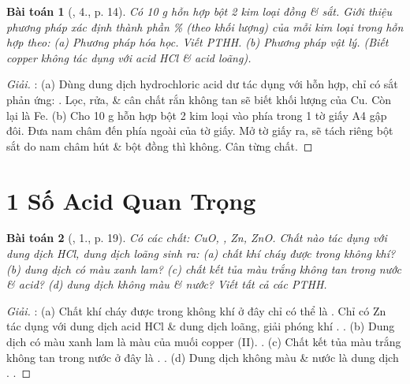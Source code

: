 \documentclass{article}
\newtheorem{baitoan}{Bài toán}
\begin{document}
\begin{baitoan}[\cite{SGK_Hoa_Hoc_9}, 4., p. 14]
	Có {\rm10 g} hỗn hợp bột 2 kim loại đồng \& sắt. Giới thiệu phương pháp xác định thành phần \% (theo khối lượng) của mỗi kim loại trong hỗn hợp theo: (a) Phương pháp hóa học. Viết PTHH. (b) Phương pháp vật lý. (Biết copper không tác dụng với acid {\rm HCl} \& acid {\rm{}} loãng).
\end{baitoan}

\begin{proof}[Giải]
	\cite[p. 12]{Ninh_giai_BT_Hoa_Hoc_9}: (a) Dùng dung dịch hydrochloric acid dư tác dụng với hỗn hợp, chỉ có sắt phản ứng: . Lọc, rửa, \& cân chất rắn không tan sẽ biết khối lượng của Cu. Còn lại là Fe. (b) Cho 10 g hỗn hợp bột 2 kim loại vào phía trong 1 tờ giấy A4 gập đôi. Đưa nam châm đến phía ngoài của tờ giấy. Mở tờ giấy ra, sẽ tách riêng bột sắt do nam châm hút \& bột đồng thì không. Cân từng chất.
\end{proof}


\section{1 Số Acid Quan Trọng}

\begin{baitoan}[\cite{SGK_Hoa_Hoc_9}, 1., p. 19]
	Có các chất: {\rm CuO, , Zn, ZnO}. Chất nào tác dụng với dung dịch {\rm HCl}, dung dịch {\rm{}} loãng sinh ra: (a) chất khí cháy được trong không khí? (b) dung dịch có màu xanh lam? (c) chất kết tủa màu trắng không tan trong nước \& acid? (d) dung dịch không màu \& nước? Viết tất cả các {\rm PTHH}.
\end{baitoan}

\begin{proof}[Giải]
	\cite[p. 13]{Ninh_giai_BT_Hoa_Hoc_9}: (a) Chất khí cháy được trong không khí ở đây chỉ có thể là . Chỉ có Zn tác dụng với dung dịch acid HCl \& dung dịch  loãng, giải phóng khí . . (b) Dung dịch có màu xanh lam là màu của muối copper (II). . (c) Chất kết tủa màu trắng không tan trong nước ở đây là . . (d) Dung dịch không màu \& nước là dung dịch . .
\end{proof}
\end{document}
